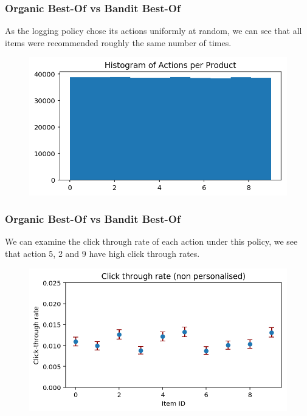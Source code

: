 \begin{frame}
\frametitle{Organic Best-Of vs Bandit Best-Of}

As the logging policy chose its actions uniformly at random, we can see that all items were recommended roughly the same number of times.

\begin{figure}[h!]
\includegraphics[scale=0.4]{images/organic_bestof0.png}
\centering
\label{motex1}
\end{figure}
\end{frame}

\begin{frame}
\frametitle{Organic Best-Of vs Bandit Best-Of}

We can examine the click through rate of each action under this policy, we see that action 5, 2 and 9 have high click through rates.

\begin{figure}[h!]
\includegraphics[scale=0.4]{images/organic_bestof1.png}
\centering
\label{motex1}
\end{figure}
\end{frame}

